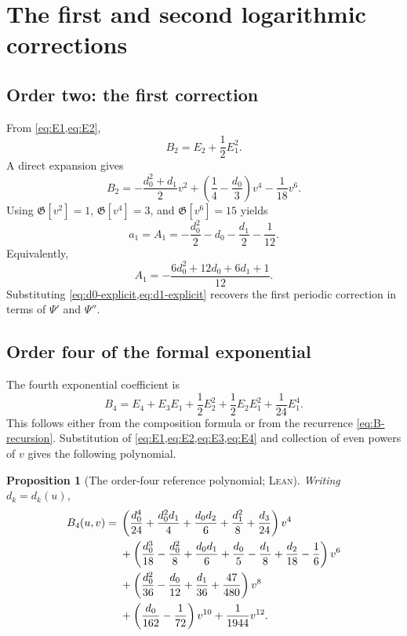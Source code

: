 \documentclass[11pt,oneside]{article}
\newtheorem{proposition}[theorem]{Proposition}
\theoremstyle{definition}
\theoremstyle{remark}
\newcommand{\Gauss}{\mathfrak G}
\newcommand{\Formalized}{\textsc{Lean}}
\begin{document}
\section{The first and second logarithmic corrections}
\label{sec:second-correction}

\subsection{Order two: the first correction}

From \cref{eq:E1,eq:E2},
\[
 B_2=E_2+\frac12E_1^2.
\]
A direct expansion gives
\[
 B_2
 =-\frac{d_0^2+d_1}{2}v^2
   +\left(\frac14-\frac{d_0}{3}\right)v^4
   -\frac1{18}v^6.
\]
Using $\Gauss[v^2]=1$, $\Gauss[v^4]=3$, and
$\Gauss[v^6]=15$ yields
\begin{equation}
 a_1=A_1
 =-\frac{d_0^2}{2}-d_0-\frac{d_1}{2}-\frac1{12}.
 \label{eq:A1-jets}
\end{equation}
Equivalently,
\[
 A_1=-\frac{6d_0^2+12d_0+6d_1+1}{12}.
\]
Substituting \cref{eq:d0-explicit,eq:d1-explicit} recovers the first
periodic correction in terms of $\Psi'$ and $\Psi''$.

\subsection{Order four of the formal exponential}

The fourth exponential coefficient is
\begin{equation}
 B_4
 =E_4+E_3E_1+\frac12E_2^2
   +\frac12E_2E_1^2+\frac1{24}E_1^4.
 \label{eq:B4-identity}
\end{equation}
This follows either from the composition formula or from the recurrence
\eqref{eq:B-recursion}.  Substitution of
\cref{eq:E1,eq:E2,eq:E3,eq:E4} and collection of even powers of $v$
gives the following polynomial.

\begin{proposition}[The order-four reference polynomial; \Formalized]
\label{prop:B4-polynomial}
Writing $d_k=d_k(u)$,
\begin{align}
 B_4(u,v)={}&
 \left(\frac{d_0^4}{24}+\frac{d_0^2d_1}{4}
       +\frac{d_0d_2}{6}+\frac{d_1^2}{8}
       +\frac{d_3}{24}\right)v^4 \notag\\
 &+\left(\frac{d_0^3}{18}-\frac{d_0^2}{8}
       +\frac{d_0d_1}{6}+\frac{d_0}{5}
       -\frac{d_1}{8}+\frac{d_2}{18}
       -\frac16\right)v^6 \notag\\
 &+\left(\frac{d_0^2}{36}-\frac{d_0}{12}
       +\frac{d_1}{36}+\frac{47}{480}\right)v^8 \notag\\
 &+\left(\frac{d_0}{162}-\frac1{72}\right)v^{10}
   +\frac1{1944}v^{12}. \label{eq:B4-polynomial}
\end{align}
\end{proposition}
\end{document}
